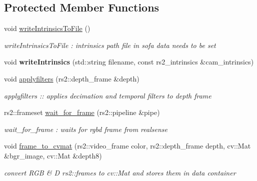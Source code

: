 \subsection*{Protected Member Functions}
\begin{DoxyCompactItemize}
\item 
\mbox{\label{classsofa_1_1rgbdtracking_1_1_real_sense_streamer_a1db9130e1444a18c5a5a3f19e8dc32da}} 
void \hyperlink{classsofa_1_1rgbdtracking_1_1_real_sense_streamer_a1db9130e1444a18c5a5a3f19e8dc32da}{write\+Intrinsics\+To\+File} ()
\begin{DoxyCompactList}\small\item\em write\+Intrinsics\+To\+File \+: intrinsics path file in sofa data needs to be set \end{DoxyCompactList}\item 
\mbox{\label{classsofa_1_1rgbdtracking_1_1_real_sense_streamer_ae7f7303c5cc323868d3bcc36d13c8689}} 
void {\bfseries write\+Intrinsics} (std\+::string filename, const rs2\+\_\+intrinsics \&cam\+\_\+intrinsics)
\item 
void \hyperlink{classsofa_1_1rgbdtracking_1_1_real_sense_streamer_a2764d9aa83b005b5872f195599b98fc6}{applyfilters} (rs2\+::depth\+\_\+frame \&depth)
\begin{DoxyCompactList}\small\item\em applyfilters \+:\+: applies decimation and temporal filters to depth frame \end{DoxyCompactList}\item 
rs2\+::frameset \hyperlink{classsofa_1_1rgbdtracking_1_1_real_sense_streamer_a3ea622968695865d727d67b72e8363c7}{wait\+\_\+for\+\_\+frame} (rs2\+::pipeline \&pipe)
\begin{DoxyCompactList}\small\item\em wait\+\_\+for\+\_\+frame \+: waits for rgbd frame from realsense \end{DoxyCompactList}\item 
\mbox{\label{classsofa_1_1rgbdtracking_1_1_real_sense_streamer_aac7fbd7301db4731d78aaf89a2022a01}} 
void \hyperlink{classsofa_1_1rgbdtracking_1_1_real_sense_streamer_aac7fbd7301db4731d78aaf89a2022a01}{frame\+\_\+to\+\_\+cvmat} (rs2\+::video\+\_\+frame color, rs2\+::depth\+\_\+frame depth, cv\+::\+Mat \&bgr\+\_\+image, cv\+::\+Mat \&depth8)
\begin{DoxyCompactList}\small\item\em convert R\+GB \& D rs2\+::frames to cv\+::\+Mat and stores them in data container \end{DoxyCompactList}\end{DoxyCompactItemize}


